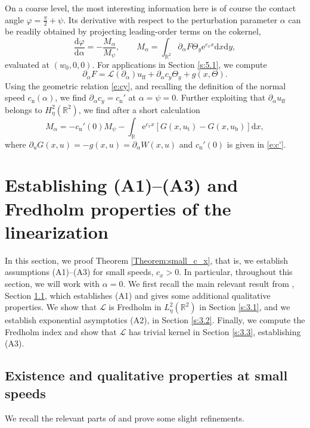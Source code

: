 \documentclass[10pt]{article}
\newcommand{\R}{\mathbb{R}}
\newcommand{\rmd}{\mathrm{d}}
\newcommand{\rme}{\mathrm{e}}
\begin{document}
On a coarse level, the most interesting information here is of course the contact angle $\varphi=\frac{\pi}{2}+\psi$. Its derivative with respect to the perturbation parameter $\alpha$ can be readily obtained by projecting leading-order terms on the cokernel, 
\begin{equation}\label{e:dp}
\frac{\rmd\varphi}{\rmd\alpha}=-\frac{M_\alpha}{M_\psi},\qquad M_\alpha=\int_{\R^2} \partial_\alpha F \Theta_y \rme^{c_x x} \rmd x \rmd y,
\end{equation}
evaluated at $(w_0,0,0)$. For applications in Section \ref{s:5.1}, we compute 
\[
\partial_\alpha F=\mathscr{L}(\partial_\alpha) u_\mathrm{ff}+\partial_\alpha c_y \Theta_y + g(x,\Theta).
\]
Using the geometric relation \eqref{e:cy}, and recalling the definition of the normal speed $c_\mathrm{n}(\alpha)$, we find $\partial_\alpha c_y=c_\mathrm{n}'$ at $\alpha=\psi=0$. Further exploiting that $\partial_\alpha u_\mathrm{ff}$ belongs to $H^2_\eta(\R^2)$, we find after a short calculation
\begin{equation}\label{e:ma}
M_\alpha=-c_\mathrm{n}'(0)M_\psi-\int_\R \rme^{c_x x} \left[G(x,u_\mathrm{t})-G(x,u_\mathrm{b})\right] \rmd x,
\end{equation}
where $\partial_u G(x,u)=-g(x,u)=\partial_\alpha W(x,u)$ and $c_\mathrm{n}'(0)$ is given in \eqref{e:c'}. 


\section{Establishing (A1)--(A3) and Fredholm properties of the linearization}\label{s:4}
In this section, we proof Theorem \ref{Theorem:small_c_x}, that is, we establish assumptions (A1)--(A3) for small speeds, $c_x>0$. In particular, throughout this section, we will work with $\alpha=0$. We first recall the main relevant result from \cite{Monteiro_Scheel}, Section \ref{s:3.0}, which establishes (A1) and gives some additional qualitative properties.  We show that $\mathscr{L}$ is Fredholm in $L^2_\eta(\R^2)$ in Section \ref{s:3.1}, and we establish exponential asymptotics (A2), in Section \ref{s:3.2}. Finally, we compute the Fredholm index and show that $\mathscr{L}$ has trivial kernel in Section \ref{s:3.3}, establishing (A3). 

\subsection{Existence and qualitative properties at small speeds}\label{s:3.0}
We recall the relevant parts of \cite[Prop. 1.4]{Monteiro_Scheel} and prove some slight refinements.
\end{document}
